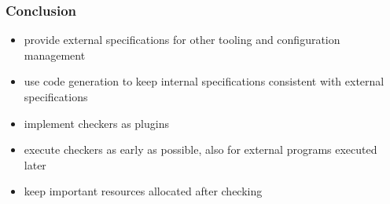 \begin{frame}
	\frametitle{Conclusion}

	\begin{itemize}[<+-| alert@+>]
	\item provide external specifications for other tooling and configuration management
	\item use code generation to keep internal specifications consistent with external specifications
	\item implement checkers as plugins
	\item execute checkers as early as possible,
	also for external programs executed later
	\item keep important resources allocated after checking
	\end{itemize}

\end{frame}






\nocite{raab2017introducing}

\appendix

\begin{frame}[allowframebreaks]
	
	
\end{frame}




